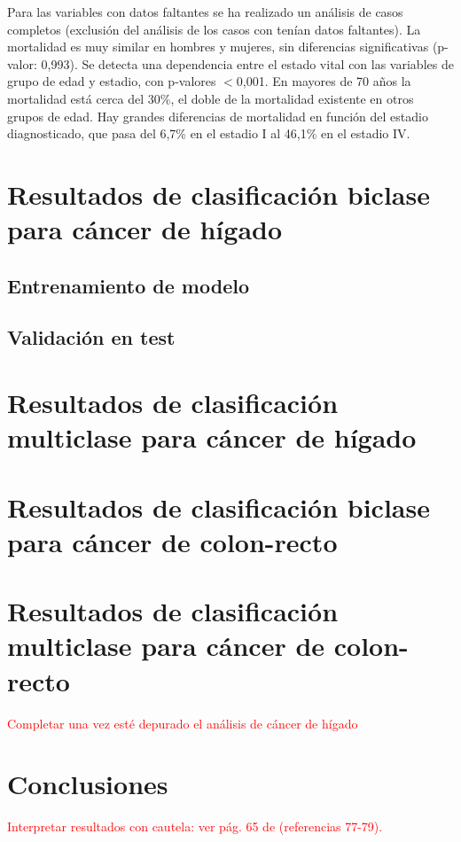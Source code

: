 Para las variables con datos faltantes se ha realizado un análisis de casos completos (exclusión del análisis de los casos con tenían datos faltantes).  La mortalidad es muy similar en hombres y mujeres, sin diferencias significativas (p-valor: 0,993). Se detecta una dependencia entre el estado vital con las variables de grupo de edad y estadio, con p-valores $<$0,001. En mayores de 70 años la mortalidad está cerca del 30\%, el doble de la mortalidad existente en otros grupos de edad. Hay grandes diferencias de mortalidad en función del estadio diagnosticado, que pasa del 6,7\% en el estadio I al 46,1\% en el estadio IV.

\section{Resultados de clasificación biclase para cáncer de hígado}

\subsection{Entrenamiento de modelo}

\subsection{Validación en test}

\section{Resultados de clasificación multiclase para cáncer de hígado}

\section{Resultados de clasificación biclase para cáncer de colon-recto}

\section{Resultados de clasificación multiclase para cáncer de colon-recto}

\textcolor{red}{Completar una vez esté depurado el análisis de cáncer de hígado}

\section{Conclusiones}

\textcolor{red}{Interpretar resultados con cautela: ver pág. 65 de \cite{CastilloSecilla2020} (referencias 77-79).}\\
